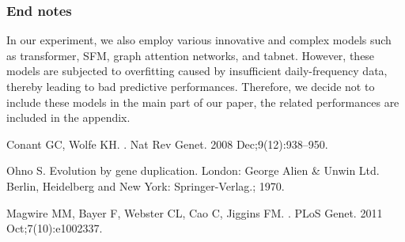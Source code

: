 \documentclass[10pt,letterpaper]{article}
\begin{document}
%
%
%
\subsubsection*{End notes}
In our experiment, we also employ various innovative and complex models such as transformer, SFM, graph attention networks, and tabnet. However, these models are subjected to overfitting caused by insufficient daily-frequency data, thereby leading to bad predictive performances. Therefore, we decide not to include these models in the main part of our paper, the related performances are included in the appendix.

\begin{thebibliography}{10}

Conant GC, Wolfe KH.
.
\newblock Nat Rev Genet. 2008 Dec;9(12):938--950.

Ohno S.
\newblock Evolution by gene duplication.
\newblock London: George Alien \& Unwin Ltd. Berlin, Heidelberg and New York:
  Springer-Verlag.; 1970.

Magwire MM, Bayer F, Webster CL, Cao C, Jiggins FM.
.
\newblock PLoS Genet. 2011 Oct;7(10):e1002337.

\end{thebibliography}
\end{document}
